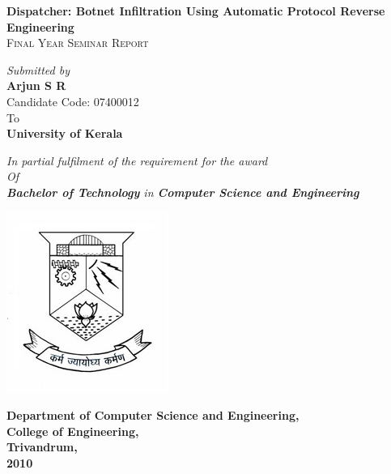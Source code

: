 \begin{titlepage}
\begin{center}


%
%
{\huge \bfseries Dispatcher: Botnet Infiltration Using Automatic
 Protocol Reverse Engineering}\\[1cm]

\textsc{\large Final Year Seminar Report}\\[1cm]

\begin{center} \large
\centering
  \emph{ Submitted by}\\ \vspace{0.3cm}
	{\bf Arjun \textsc{S R} }\\ \vspace{0.3cm}
	Candidate Code: 07400012\\ \vspace{0.75cm}
  To\\[0.5cm]

  {\large \bf University of Kerala}
  
{\large \it In partial fulfilment of the requirement for the award\\ Of \\
 {\large \bf Bachelor of Technology} in {\bf Computer Science and Engineering} } 

\includegraphics{cetemblem.jpg}
\end{center}

%
%

{\bf \large Department of Computer Science and Engineering,\\ College of Engineering,\\ Trivandrum,\\ 2010 }

\end{center}

\end{titlepage}

